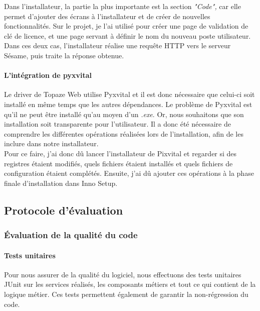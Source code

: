Dans l'installateur, la partie la plus importante est la section \textit{"Code",} car elle permet d'ajouter des écrans à l'installateur et de créer de nouvelles fonctionnalités. Sur le projet, je l'ai utilisé pour créer une page de validation de clé de licence, et une page servant à définir le nom du nouveau poste utilisateur.\\
Dans ces deux cas, l'installateur réalise une requête HTTP vers le serveur Sésame, puis traite la réponse obtenue. 

\paragraph*{L'intégration de pyxvital\\}


Le driver de Topaze Web utilise Pyxvital et il est donc nécessaire que celui-ci soit installé en même temps que les autres dépendances. Le problème de Pyxvital est qu'il ne peut être installé qu'au moyen d'un \textit{.exe}. Or, nous souhaitons que son installation soit transparente pour l'utilisateur. Il a donc été nécessaire de comprendre les différentes opérations réalisées lors de l'installation, afin de les inclure dans notre installateur.\\
Pour ce faire, j'ai donc d\^u lancer l'installateur de Pixvital et regarder si des registres étaient modifiés, quels fichiers étaient installés et quels fichiers de configuration étaient complétés. Ensuite, j'ai dû ajouter ces opérations à la phase finale d'installation dans Inno Setup.

\subsection{Protocole d'évaluation}
\subsubsection{Évaluation de la qualité du code}
\paragraph*{Tests unitaires\\}
Pour nous assurer de la qualité du logiciel, nous effectuons des tests unitaires JUnit sur les services réalisés, les composants métiers et tout ce qui contient de la logique métier. Ces tests permettent également de garantir la non-régression du code.

